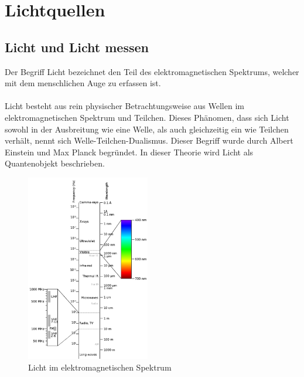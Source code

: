 \documentclass[11pt]{scrartcl}
\begin{document}
\section{Lichtquellen}
\subsection{Licht und Licht messen} \label{light and measurement}
Der Begriff Licht bezeichnet den Teil des elektromagnetischen Spektrums, welcher mit dem menschlichen Auge zu erfassen ist.\\
\\
Licht besteht aus rein physischer Betrachtungsweise aus Wellen im elektromagnetischen Spektrum und Teilchen. Dieses Phänomen, dass sich
Licht sowohl in der Ausbreitung wie eine Welle, als auch gleichzeitig ein wie Teilchen verhält, nennt sich Welle-Teilchen-Dualismus.
Dieser Begriff wurde durch Albert Einstein und Max Planck begründet. In dieser Theorie wird Licht als Quantenobjekt
beschrieben. \cite{wikiLicht}\\
\begin{figure}
    \vspace{-25pt}
    \begin{center}
        \includegraphics[width=0.48\textwidth]{images/Elektromagnetisches-Spektrum.png}
    \end{center}
    \vspace{-20pt}
    \caption{Licht im elektromagnetischen Spektrum \cite{spectrumLight}}
    \vspace{-15pt}
\end{figure}
\end{document}
